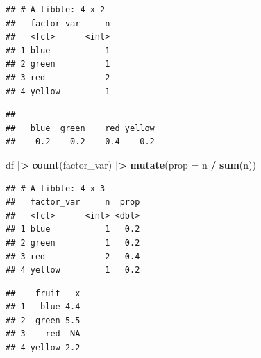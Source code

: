 \documentclass[
  12pt,
  oneside]{book}
\newenvironment{Shaded}{\begin{snugshade}}{\end{snugshade}}
\newcommand{\AttributeTok}[1]{\textcolor[rgb]{0.13,0.29,0.53}{#1}}
\newcommand{\CommentTok}[1]{\textcolor[rgb]{0.56,0.35,0.01}{\textit{#1}}}
\newcommand{\ConstantTok}[1]{\textcolor[rgb]{0.56,0.35,0.01}{#1}}
\newcommand{\FunctionTok}[1]{\textcolor[rgb]{0.13,0.29,0.53}{\textbf{#1}}}
\newcommand{\NormalTok}[1]{#1}
\newcommand{\SpecialCharTok}[1]{\textcolor[rgb]{0.81,0.36,0.00}{\textbf{#1}}}
\theoremstyle{definition}
\theoremstyle{definition}
\theoremstyle{definition}
\theoremstyle{definition}
\theoremstyle{remark}
\begin{document}
\begin{verbatim}
## # A tibble: 4 x 2
##   factor_var     n
##   <fct>      <int>
## 1 blue           1
## 2 green          1
## 3 red            2
## 4 yellow         1
\end{verbatim}

\begin{Shaded}
\end{Shaded}

\begin{verbatim}
## 
##   blue  green    red yellow 
##    0.2    0.2    0.4    0.2
\end{verbatim}

\begin{Shaded}
\begin{Highlighting}[]
\NormalTok{df }\SpecialCharTok{|\textgreater{}} 
  \FunctionTok{count}\NormalTok{(factor\_var) }\SpecialCharTok{|\textgreater{}} 
  \FunctionTok{mutate}\NormalTok{(}\AttributeTok{prop =}\NormalTok{ n }\SpecialCharTok{/} \FunctionTok{sum}\NormalTok{(n))}
\end{Highlighting}
\end{Shaded}

\begin{verbatim}
## # A tibble: 4 x 3
##   factor_var     n  prop
##   <fct>      <int> <dbl>
## 1 blue           1   0.2
## 2 green          1   0.2
## 3 red            2   0.4
## 4 yellow         1   0.2
\end{verbatim}

\begin{Shaded}
\end{Shaded}

\begin{verbatim}
##    fruit   x
## 1   blue 4.4
## 2  green 5.5
## 3    red  NA
## 4 yellow 2.2
\end{verbatim}

\begin{Shaded}
\end{Shaded}
\end{document}
